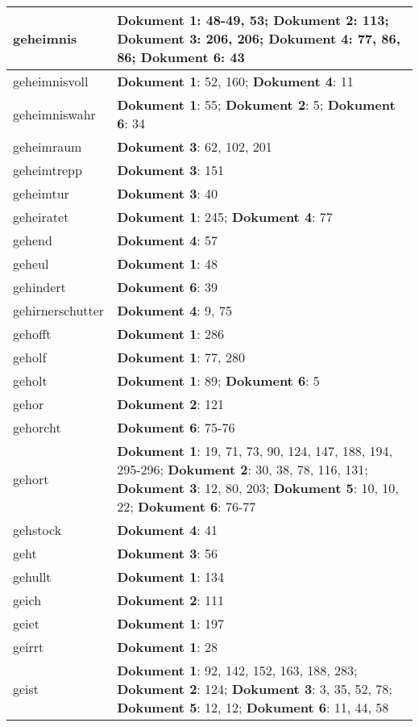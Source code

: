 \documentclass[a5paper]{article}
\begin{document}
\begin{longtable}[l]{|l|p{3in}|}
\hline
geheimnis & \textbf{Dokument 1}: 48-49, 53; \textbf{Dokument 2}: 113; \textbf{Dokument 3}: 206, 206; \textbf{Dokument 4}: 77, 86, 86; \textbf{Dokument 6}: 43 \\
\hline
geheimnisvoll & \textbf{Dokument 1}: 52, 160; \textbf{Dokument 4}: 11 \\
\hline
geheimniswahr & \textbf{Dokument 1}: 55; \textbf{Dokument 2}: 5; \textbf{Dokument 6}: 34 \\
\hline
geheimraum & \textbf{Dokument 3}: 62, 102, 201 \\
\hline
geheimtrepp & \textbf{Dokument 3}: 151 \\
\hline
geheimtur & \textbf{Dokument 3}: 40 \\
\hline
geheiratet & \textbf{Dokument 1}: 245; \textbf{Dokument 4}: 77 \\
\hline
gehend & \textbf{Dokument 4}: 57 \\
\hline
geheul & \textbf{Dokument 1}: 48 \\
\hline
gehindert & \textbf{Dokument 6}: 39 \\
\hline
gehirnerschutter & \textbf{Dokument 4}: 9, 75 \\
\hline
gehofft & \textbf{Dokument 1}: 286 \\
\hline
geholf & \textbf{Dokument 1}: 77, 280 \\
\hline
geholt & \textbf{Dokument 1}: 89; \textbf{Dokument 6}: 5 \\
\hline
gehor & \textbf{Dokument 2}: 121 \\
\hline
gehorcht & \textbf{Dokument 6}: 75-76 \\
\hline
gehort & \textbf{Dokument 1}: 19, 71, 73, 90, 124, 147, 188, 194, 295-296; \textbf{Dokument 2}: 30, 38, 78, 116, 131; \textbf{Dokument 3}: 12, 80, 203; \textbf{Dokument 5}: 10, 10, 22; \textbf{Dokument 6}: 76-77 \\
\hline
gehstock & \textbf{Dokument 4}: 41 \\
\hline
geht & \textbf{Dokument 3}: 56 \\
\hline
gehullt & \textbf{Dokument 1}: 134 \\
\hline
geich & \textbf{Dokument 2}: 111 \\
\hline
geiet & \textbf{Dokument 1}: 197 \\
\hline
geirrt & \textbf{Dokument 1}: 28 \\
\hline
geist & \textbf{Dokument 1}: 92, 142, 152, 163, 188, 283; \textbf{Dokument 2}: 124; \textbf{Dokument 3}: 3, 35, 52, 78; \textbf{Dokument 5}: 12, 12; \textbf{Dokument 6}: 11, 44, 58 \\

\end{longtable}
\end{document}
